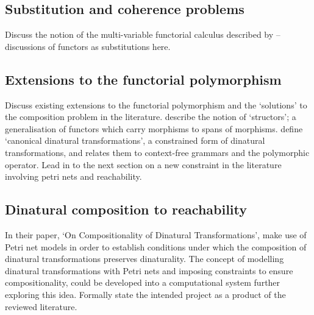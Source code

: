 \documentclass[../../Dissertation.tex]{subfiles}
\begin{document}
\subsection{Substitution and coherence problems}
Discuss the notion of the multi-variable functorial calculus described by  -- discussions of functors as substitutions here.

\subsection{Extensions to the functorial polymorphism}
Discuss existing extensions to the functorial polymorphism and the `solutions' to the composition problem in the literature.
\newline\newline
{} describe the notion of `structors'; a generalisation of functors which carry morphisms to spans of morphisms.
\newline\newline
{} define `canonical dinatural transformations', a constrained form of dinatural transformations, and relates them to context-free grammars and the polymorphic operator.
\newline\newline
Lead in to the next section on a new constraint in the literature involving petri nets and reachability.

\subsection{Dinatural composition to reachability}
In their paper, `On Compositionality of Dinatural Transformations',  make use of Petri net models in order to establish conditions under which the composition of dinatural transformations preserves dinaturality. The concept of modelling dinatural transformations with Petri nets and imposing constraints to ensure compositionality, could be developed into a computational system further exploring this idea.
\newline\newline
Formally state the intended project as a product of the reviewed literature.
\end{document}
